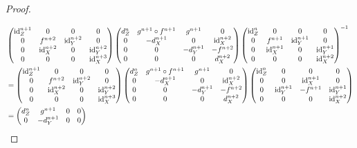 \begin{proof}
\begin{gather*}
	\end{gather*}
\begin{align*}
	&\begin{pmatrix}
		\mathrm{id}_{Z}^{n+1} & 0 & 0 & 0\\
		0 & f^{n+2} & \mathrm{id}_{Y}^{n+2}& 0\\
		0 & \mathrm{id}_{X}^{n+2} & 0 & \mathrm{id}_{Y}^{n+2}\\
		0 & 0 & 0 & \mathrm{id}_{X}^{n+3}
	\end{pmatrix}
	\begin{pmatrix}
		d_{Z}^{n} & g^{n+1}\circ f^{n+1} & g^{n+1}& 0\\
0 & -d_X^{n+1}& 0 & \mathrm{id}^{n+2}_{X}\\
0 & 0 & -d_Y^{n+1} & -f^{n+2}\\
0 & 0 & 0 & d_X^{n+2}\end{pmatrix}
	\begin{pmatrix}
		\mathrm{id}_{Z}^{n} & 0 & 0 & 0\\
		0 & f^{n+1} & \mathrm{id}_{Y}^{n+1}& 0\\
		0 & \mathrm{id}_{X}^{n+1} & 0 & \mathrm{id}_{Y}^{n+1}\\
		0 & 0 & 0 & \mathrm{id}_{X}^{n+2}
	\end{pmatrix}^{-1}\\
	&= 
	\begin{pmatrix}
		\mathrm{id}_{Z}^{n+1} & 0 & 0 & 0\\
		0 & f^{n+2} & \mathrm{id}_{Y}^{n+2}& 0\\
		0 & \mathrm{id}_{X}^{n+2} & 0 & \mathrm{id}_{Y}^{n+2}\\
		0 & 0 & 0 & \mathrm{id}_{X}^{n+3}
	\end{pmatrix}
	\begin{pmatrix}
		d_{Z}^{n} & g^{n+1}\circ f^{n+1} & g^{n+1}& 0\\
0 & -d_X^{n+1}& 0 & \mathrm{id}^{n+2}_{X}\\
0 & 0 & -d_Y^{n+1} & -f^{n+2}\\
0 & 0 & 0 & d_X^{n+2}\end{pmatrix}
	\begin{pmatrix}
		\mathrm{id}_{Z}^{n} & 0 & 0 & 0\\
		0 & 0 & \mathrm{id}_{X}^{n+1}& 0\\
		0 & \mathrm{id}_{Y}^{n+1} & -f^{n+1} & \mathrm{id}_{Y}^{n+1}\\
		0 & 0 & 0 & \mathrm{id}_{X}^{n+2}
	\end{pmatrix}\\
	&=
	\begin{pmatrix}
		d_{Z}^{n} & g^{n+1}& 0 & 0\\
0 & -d_Y^{n+1}& 0 & 0\\

\end{pmatrix}
\end{align*}
\end{proof}
